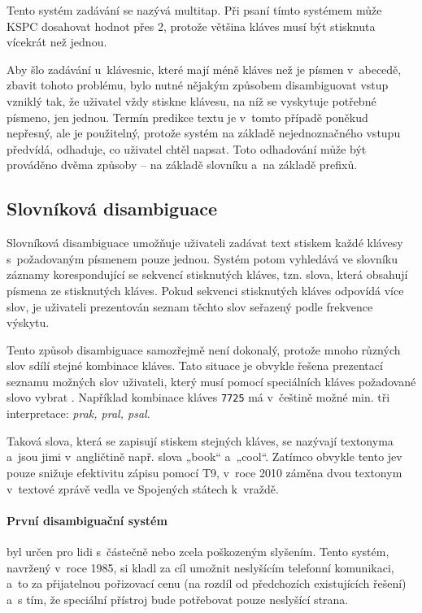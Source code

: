 \documentclass[a4paper,11pt,openany]{book} %
\begin{document}
Tento systém zadávání se nazývá multitap. Při psaní tímto systémem může KSPC dosahovat hodnot přes 2, protože většina kláves musí být stisknuta vícekrát než jednou. \parencite[202]{mackenzie2002kspc}

Aby šlo zadávání u~klávesnic, které mají méně kláves než je písmen v~abecedě, zbavit tohoto problému, bylo nutné nějakým způsobem disambiguovat vstup vzniklý tak, že uživatel vždy stiskne klávesu, na níž se vyskytuje potřebné písmeno, jen jednou. Termín predikce textu je v~tomto případě poněkud nepřesný, ale je použitelný, protože systém na základě nejednoznačného vstupu předvídá, odhaduje, co uživatel chtěl napsat. Toto odhadování může být prováděno dvěma způsoby -- na základě slovníku a~na základě prefixů.


\subsection{Slovníková disambiguace}

Slovníková disambiguace umožňuje uživateli zadávat text stiskem každé klávesy s~požadovaným písmenem pouze jednou. Systém potom vyhledává ve slovníku záznamy korespondující se sekvencí stisknutých kláves, tzn. slova, která obsahují písmena ze stisknutých kláves. Pokud sekvenci stisknutých kláves odpovídá více slov, je uživateli prezentován seznam těchto slov seřazený podle frekvence výskytu. %

Tento způsob disambiguace samozřejmě není dokonalý, protože mnoho různých slov sdílí stejné kombinace kláves. Tato situace je obvykle řešena prezentací seznamu možných slov uživateli, který musí pomocí speciálních kláves požadované slovo vybrat \parencite{MacKenzie2001}. Například kombinace kláves {\tt 7725} má v~češtině možné min. tři interpretace: {\it prak, pral, psal}.

Taková slova, která se zapisují stiskem stejných kláves, se nazývají textonyma \parencite{ericzorn2007} a~jsou jimi v~angličtině např. slova „book“ a~„cool“. Zatímco obvykle tento jev pouze snižuje efektivitu zápisu pomocí T9, v~roce 2010 záměna dvou textonym v~textové zprávě vedla ve Spojených státech k~vraždě. \parencite{t9kill}

\paragraph{První disambiguační systém} byl určen pro lidi s~částečně nebo zcela poškozeným slyšením. Tento systém, navržený v~roce 1985, si kladl za cíl umožnit neslyšícím telefonní komunikaci, a~to za přijatelnou pořizovací cenu (na rozdíl od předchozích existujících řešení) a~s tím, že speciální přístroj bude potřebovat pouze neslyšící strana. \parencite{feinson1988interpretive}
\end{document}
